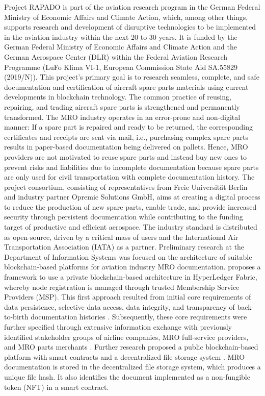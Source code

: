 Project RAPADO is part of the aviation research program in the German Federal Ministry of Economic Affairs and Climate Action, which, among other things, supports research and development of disruptive technologies to be implemented in the aviation industry within the next 20 to 30 years. It is funded by the German Federal Ministry of Economic Affairs and Climate Action and the German Aerospace Center (DLR) within the Federal Aviation Research Programme (LuFo Klima VI-1, European Commission State Aid SA.55829 (2019/N)). This project's primary goal is to research seamless, complete, and safe documentation and certification of aircraft spare parts materials using current developments in blockchain technology. The common practice of reusing, repairing, and trading aircraft spare parts is strengthened and permanently transformed. The MRO industry operates in an error-prone and non-digital manner: If a spare part is repaired and ready to be returned, the corresponding certificates and receipts are sent via mail, i.e., purchasing complex spare parts results in paper-based documentation being delivered on pallets. Hence, MRO providers are not motivated to reuse spare parts and instead buy new ones to prevent risks and liabilities due to incomplete documentation because spare parts are only used for civil transportation with complete documentation history. The project consortium, consisting of representatives from Freie Universit{\"a}t Berlin and industry partner Opremic Solutions GmbH, aims at creating a digital process to reduce the production of new spare parts, enable trade, and provide increased security through persistent documentation while contributing to the funding target of productive and efficient aerospace. The industry standard is distributed as open-source, driven by a critical mass of users and the International Air Transportation Association (IATA) as a partner.
Preliminary research at the Department of Information Systems was focused on the architecture of suitable blockchain-based platforms for aviation industry MRO documentation. \citet{WickboldtMeiseKliewer} proposes a framework to use a private blockchain-based architecture in HyperLedger Fabric, whereby node registration is managed through trusted Membership Service Providers (MSP). This first approach resulted from initial core requirements of data persistence, selective data access, data integrity, and transparency of back-to-birth documentation histories \citep{WickboldtClemens2018BzdD}. Subsequently, these core requirements were further specified through extensive information exchange with previously identified stakeholder groups of airline companies, MRO full-service providers, and MRO parts merchants \citep{ZedelJ}. Further research proposed a public blockchain-based platform with smart contracts and a decentralized file storage system \citep{ZedelJ}. MRO documentation is stored in the decentralized file storage system, which produces a unique file hash. It also identifies the document implemented as a non-fungible token (NFT) in a smart contract.
